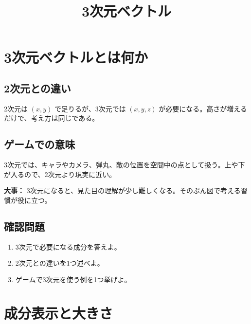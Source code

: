 \documentclass[paper=a4,fleqn]{jlreq}
\title{3次元ベクトル}
\author{}
\date{}
\makeatletter
\renewcommand{\maketitle}{%
  \begin{center}
    {\large\bfseries \@title\par}
  \end{center}
  \vspace{4pt}
}
\makeatother
\begin{document}
\maketitle

\section{3次元ベクトルとは何か}

\subsection{2次元との違い}

2次元は \((x,y)\) で足りるが、3次元では \((x,y,z)\) が必要になる。高さが増えるだけで、考え方は同じである。

\begin{center}
\end{center}

\subsection{ゲームでの意味}

3次元では、キャラやカメラ、弾丸、敵の位置を空間中の点として扱う。上や下が入るので、2次元より現実に近い。

\textbf{大事：} 3次元になると、見た目の理解が少し難しくなる。そのぶん図で考える習慣が役に立つ。

\subsection{確認問題}
\begin{enumerate}
  \item 3次元で必要になる成分を答えよ。
  \item 2次元との違いを1つ述べよ。
  \item ゲームで3次元を使う例を1つ挙げよ。
\end{enumerate}

\section{成分表示と大きさ}
\end{document}
